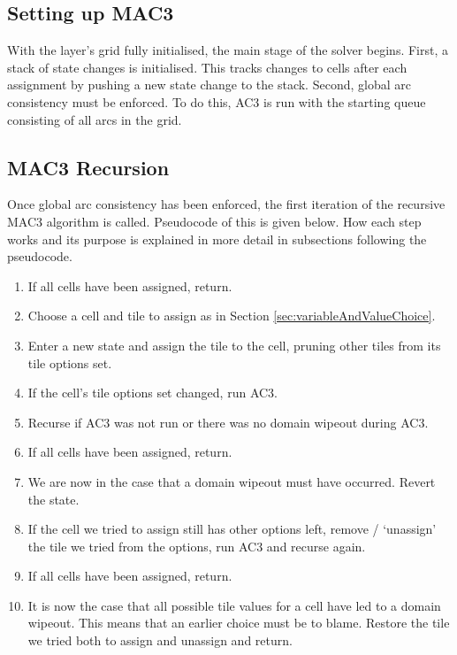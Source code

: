 \subsection{Setting up MAC3}
With the layer's grid fully initialised, the main stage of the solver begins. First, a stack of state changes is initialised. This tracks changes to cells after each assignment by pushing a new state change to the stack. Second, global arc consistency must be enforced. To do this, AC3 is run with the starting queue consisting of all arcs in the grid.

\subsection{MAC3 Recursion}
Once global arc consistency has been enforced, the first iteration of the recursive MAC3 algorithm is called. Pseudocode of this is given below. How each step works and its purpose is explained in more detail in subsections following the pseudocode.

\begin{enumerate}
    \item If all cells have been assigned, return.
    \item Choose a cell and tile to assign as in Section \ref{sec:variableAndValueChoice}.
    \item Enter a new state and assign the tile to the cell, pruning other tiles from its tile options set.
    \item If the cell's tile options set changed, run AC3.
    \item Recurse if AC3 was not run or there was no domain wipeout during AC3.
    \item If all cells have been assigned, return.
    \item We are now in the case that a domain wipeout must have occurred. Revert the state.
    \item If the cell we tried to assign still has other options left, remove / `unassign' the tile we tried from the options, run AC3 and recurse again.
    \item If all cells have been assigned, return.
    \item It is now the case that all possible tile values for a cell have led to a domain wipeout. This means that an earlier choice must be to blame. Restore the tile we tried both to assign and unassign and return.
\end{enumerate}

